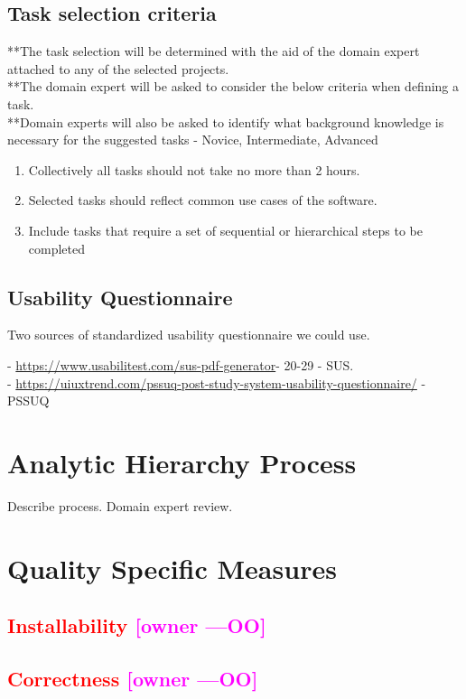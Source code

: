 \documentclass[letterpaper,cleveref]{lipics-v2019}
\newcommand{\authornote}[3]{\textcolor{#1}{[#3 ---#2]}}
\newcommand{\authornote}[3]{}
\newcommand{\oo}[1]{\authornote{magenta}{OO}{#1}} %
\newcommand{\notdone}[1]{\textcolor{red}{#1}}
\theoremstyle{definition}
\begin{document}
\subsection{Task selection criteria}
**The task selection will be determined with the aid of the domain expert attached to any of the selected projects.\\ 
**The domain expert will be asked to consider the below criteria when defining a task. \\
**Domain experts will also be asked to identify what background knowledge is necessary for the suggested tasks - Novice, Intermediate, Advanced
\begin {enumerate}
\item Collectively all tasks should not take no more than 2 hours.
\item Selected tasks should reflect common use cases of  the software.
\item Include tasks that require a set of sequential or hierarchical steps to be completed 

\end {enumerate} 


\subsection{Usability Questionnaire}
Two sources of standardized usability questionnaire we could use.

- \url{https://www.usabilitest.com/sus-pdf-generator}- 20-29 - SUS.\\
- \url{https://uiuxtrend.com/pssuq-post-study-system-usability-questionnaire/} - PSSUQ


\section{Analytic Hierarchy Process}

Describe process.  Domain expert review.

\section{Quality Specific Measures}

\subsection{\notdone{Installability} \oo{owner}}

\subsection{\notdone{Correctness} \oo{owner}}
\end{document}
